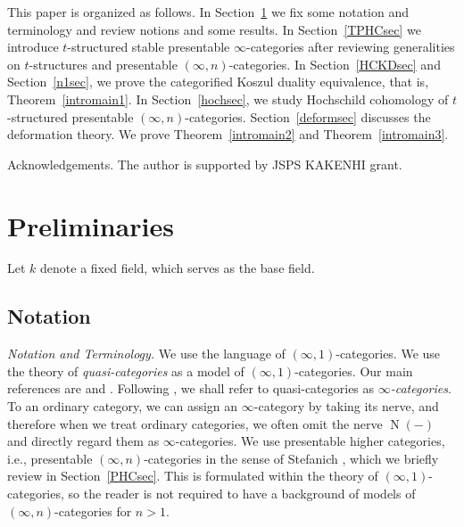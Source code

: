 \documentclass[leqno,12pt]{amsart}
\theoremstyle{plain}
\theoremstyle{definition}
\newcommand{\NNNN}{\operatorname{N}}
\begin{document}
\vspace{2mm}






This paper is organized as follows.
In Section~\ref{Pre} we fix some notation and terminology
and review notions and some results.
In Section~\ref{TPHCsec} we introduce $t$-structured stable presentable $\infty$-categories
after reviewing generalities on $t$-structures and presentable $(\infty,n)$-categories.
In Section~\ref{HCKDsec} and Section~\ref{n1sec},
we prove the categorified Koszul duality equivalence, that is, Theorem~\ref{intromain1}.
In Section~\ref{hochsec}, we study Hochschild cohomology of $t$-structured presentable $(\infty,n)$-categories. 
Section~\ref{deformsec} discusses the deformation theory. We prove Theorem~\ref{intromain2} and Theorem~\ref{intromain3}.


\vspace{3mm}

Acknowledgements. The author is supported by JSPS KAKENHI grant.




\section{Preliminaries}

\label{Pre}


Let $k$ denote a fixed field, which serves as the base field.




\subsection{Notation}

\label{notation}




{\it Notation and Terminology.}
We use 
the language of $(\infty,1)$-categories.
We use the theory of {\it quasi-categories} as a model of $(\infty,1)$-categories.
Our main references are \cite{HTT}
 and \cite{HA}.
Following \cite{HTT}, we shall refer to quasi-categories
as {\it $\infty$-categories}.
To an ordinary category, we can assign an $\infty$-category by taking
its nerve, and therefore
when we treat ordinary categories, we often omit the nerve $\NNNN(-)$
and directly regard them as $\infty$-categories.
We use presentable higher categories, i.e., presentable $(\infty,n)$-categories in the sense of Stefanich \cite{Ste}, which we briefly review in Section~\ref{PHCsec}.
This is formulated within the theory of $(\infty,1)$-categories, so the reader is not required to have a background of models of
$(\infty,n)$-categories for $n>1$.
\end{document}
